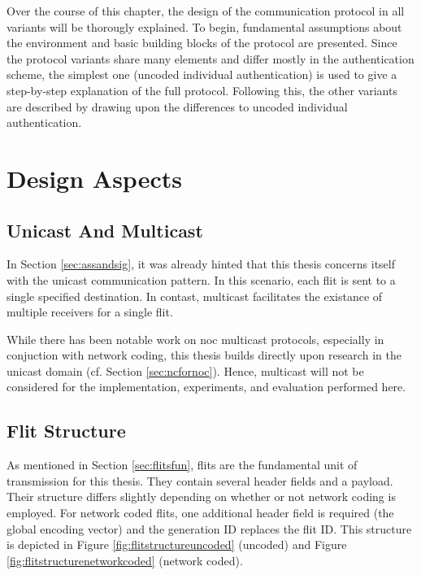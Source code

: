 


Over the course of this chapter, the design of the communication protocol in all variants will be thorougly explained. To begin, fundamental
assumptions about the environment and basic building blocks of the protocol are presented. Since the protocol variants share many elements and differ
mostly in the authentication scheme, the simplest one (uncoded individual authentication) is used to give a step-by-step explanation of the full
protocol. Following this, the other variants are described by drawing upon the differences to uncoded individual authentication.

\section{Design Aspects}
\subsection{Unicast And Multicast}
In Section \ref{sec:assandsig}, it was already hinted that this thesis concerns itself with the unicast communication pattern. In this scenario, each
flit is sent to a single specified destination. In contast, multicast facilitates the existance of multiple receivers for a single flit.

While there has been notable work on \gls{noc} multicast protocols, especially in conjuction with network coding, this thesis builds directly upon
research in the unicast domain (cf. Section \ref{sec:ncfornoc}). Hence, multicast will not be considered for the implementation, experiments, and
evaluation performed here.

\subsection{Flit Structure}\label{subsec:flitstructure}
As mentioned in Section \ref{sec:flitsfun}, flits are the fundamental unit of transmission for this thesis. They contain several header fields and a
payload. Their structure differs slightly depending on whether or not network coding is employed. For network coded flits, one additional
header field is required (the global encoding vector) and the generation ID replaces the flit ID. This structure is depicted in Figure
\vref{fig:flitstructureuncoded} (uncoded) and Figure \ref{fig:flitstructurenetworkcoded} (network coded).

